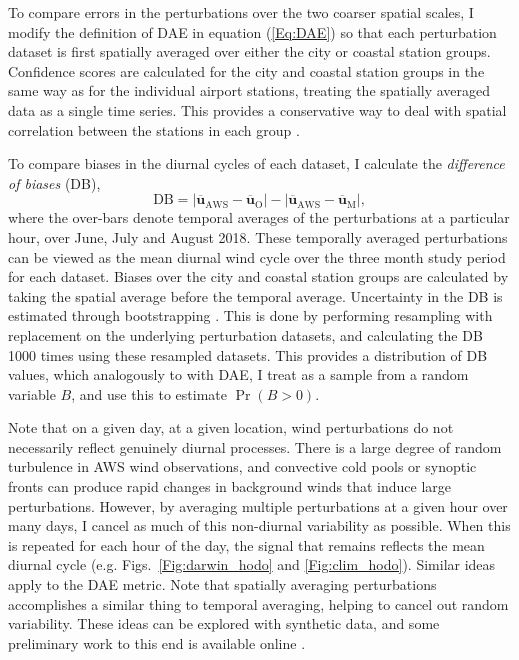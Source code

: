 \documentclass{ametsoc}
\DeclareMathOperator{\pr}{Pr}
\begin{document}
To compare errors in the perturbations over the two coarser spatial scales, I modify the definition of DAE in equation (\ref{Eq:DAE}) so that each perturbation dataset is first spatially averaged over either the city or coastal station groups. Confidence scores are calculated for the city and coastal station groups in the same way as for the individual airport stations, treating the spatially averaged data as a single time series. This provides a conservative way to deal with spatial correlation between the stations in each group \citep{griffiths17}. 

To compare biases in the diurnal cycles of each dataset, I calculate the \textit{difference of biases} (DB),
\begin{equation}
\text{DB} = \left\lvert \overline{\mathbf{u}}_{\text{AWS}}-\overline{\mathbf{u}}_{\text{O}} \right\rvert - \left\lvert \overline{\mathbf{u}}_{\text{AWS}}-\overline{\mathbf{u}}_{\text{M}} \right\rvert,
\end{equation}
where the over-bars denote temporal averages of the perturbations at a particular hour, over June, July and August 2018. These temporally averaged perturbations can be viewed as the mean diurnal wind cycle over the three month study period for each dataset. Biases over the city and coastal station groups are calculated by taking the spatial average before the temporal average. Uncertainty in the DB is estimated through bootstrapping \citep{efron79}. This is done by performing resampling with replacement on the underlying perturbation datasets, and calculating the DB 1000 times using these resampled datasets. This provides a distribution of DB values, which analogously to with DAE, I treat as a sample from a random variable $B$, and use this to estimate $\pr\left(B > 0\right)$.

Note that on a given day, at a given location, wind perturbations do not necessarily reflect genuinely diurnal processes. There is a large degree of random turbulence in AWS wind observations, and convective cold pools or synoptic fronts can produce rapid changes in background winds that induce large perturbations. However, by averaging multiple perturbations at a given hour over many days, I cancel as much of this non-diurnal variability as possible. When this is repeated for each hour of the day, the signal that remains reflects the mean diurnal cycle (e.g. Figs.~\ref{Fig:darwin_hodo} and \ref{Fig:clim_hodo}). Similar ideas apply to the DAE metric. Note that spatially averaging perturbations accomplishes a similar thing to temporal averaging, helping to cancel out random variability. These ideas can be explored with synthetic data, and some preliminary work to this end is available online \citep{short20}.
\end{document}
